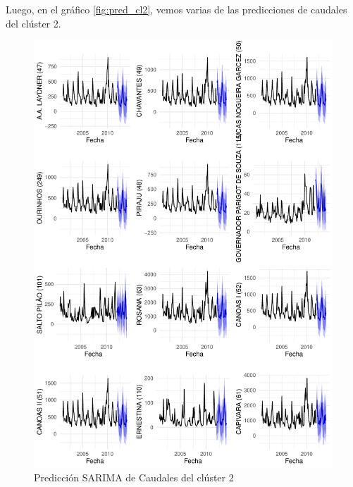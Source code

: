\documentclass[12pt,oneside]{book}\usepackage[]{graphicx}\usepackage[]{color}
\makeatletter
\def\maxwidth{ %
  \ifdim\Gin@nat@width>\linewidth
    \linewidth
  \else
    \Gin@nat@width
  \fi
}
\newenvironment{knitrout}{}{} %
\theoremstyle{definition} %
\makeatother
\begin{document}
\begin{knitrout}
\end{knitrout}


Luego, en el gráfico \ref{fig:pred_cl2}, vemos varias de las predicciones de caudales del clúster 2.

\begin{knitrout}
\color{fgcolor}\begin{figure}[h]

{\centering \includegraphics[width=\maxwidth,height=0.85\textheight]{figure/unnamed-chunk-81-1} 

}

\caption{\label{fig:pred_cl2} Predicción SARIMA de Caudales del clúster 2}\label{fig:unnamed-chunk-81}
\end{figure}


\end{knitrout}
\end{document}
